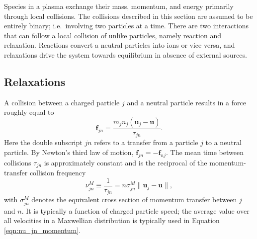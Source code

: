 Species in a plasma exchange their mass, momentum, and energy primarily through local collisions. The collisions described in this section are assumed to be entirely binary; i.e.\ involving two particles at a
time. There are two interactions that can follow a local collision of unlike particles, namely reaction and relaxation. Reactions convert a neutral particles into ions or vice versa, and relaxations drive the
system towards equilibrium in absence of external sources.

\subsection{Relaxations}
\label{sect:relaxations}
A collision between a charged particle $j$ and a neutral particle results in a force roughly equal to
\begin{equation}
    \mathbf{f}_{jn} = \frac{m_j n_j (\mathbf{u}_j - \mathbf{u})}{\tau_{jn}}.
    \label{eqn:momentum_relaxation_jn}
\end{equation}
Here the double subscript $jn$ refers to a transfer from a particle $j$ to a neutral particle. By Newton's third law of motion, $\mathbf{f}_{jn} = -\mathbf{f}_{nj}$. The mean time between collisions $\tau_{jn}$
is approximately constant and is the reciprocal of the momentum-transfer collision frequency
\begin{equation}
    \nu_{jn}^M \equiv \frac{1}{\tau_{jn}} = n \sigma^{M}_{jn} \lVert \mathbf{u}_j - \mathbf{u} \rVert,
    \label{eqn:nu_jn_momentum}
\end{equation}
with $\sigma^{M}_{jn}$ denotes the equivalent cross section of momentum transfer between $j$ and $n$. It is typically a function of charged particle speed; the average value over all velocities in a Maxwellian
distribution is typically used in Equation \ref{eqn:nu_jn_momentum}.

